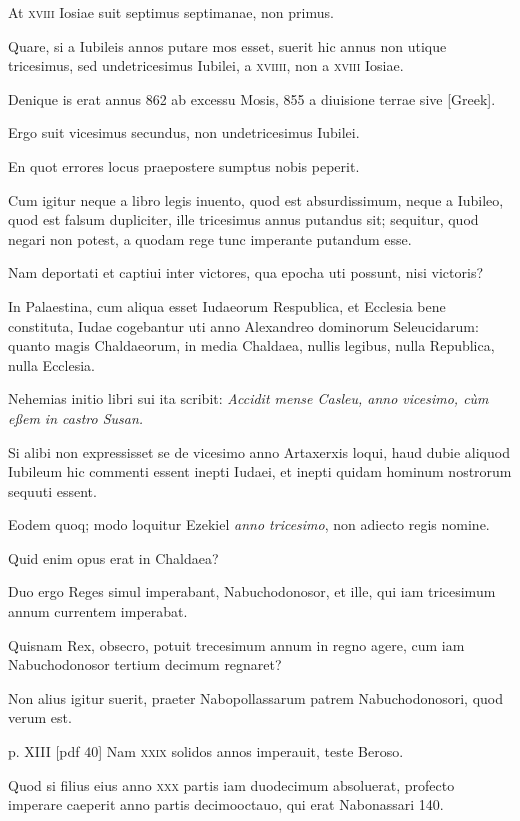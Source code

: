 \begin{parnumbers}
At \textsc{xviii} Iosiae suit septimus septimanae, non primus.

Quare, si a Iubileis annos putare mos esset, suerit hic annus non utique
tricesimus, sed undetricesimus Iubilei, a \textsc{xviiii}, non a
\textsc{xviii} Iosiae.

Denique is erat annus 862 ab excessu Mosis, 855 a
diuisione terrae sive \textgreek{[Greek]}.

Ergo suit vicesimus secundus, non
undetricesimus Iubilei.

En quot errores locus praepostere sumptus
nobis peperit.

Cum igitur neque a libro legis inuento, quod est absurdissimum,
neque a Iubileo, quod est falsum dupliciter, ille tricesimus
annus putandus sit; sequitur, quod negari non potest, a
quodam rege tunc imperante putandum esse.

Nam deportati et captiui
inter victores, qua epocha uti possunt, nisi victoris?

In Palaestina,
cum aliqua esset Iudaeorum Respublica, et Ecclesia bene constituta,
Iudae cogebantur uti anno Alexandreo dominorum Seleucidarum:
quanto magis Chaldaeorum, in media Chaldaea, nullis legibus,
nulla Republica, nulla Ecclesia.

Nehemias initio libri sui ita
scribit: \textit{Accidit mense Casleu, anno vicesimo, cùm eßem in castro Susan.}

Si alibi non expressisset se de vicesimo anno Artaxerxis loqui, haud
dubie aliquod Iubileum hic commenti essent inepti Iudaei, et inepti
quidam hominum nostrorum sequuti essent.

Eodem quoq; modo
loquitur Ezekiel \textit{anno tricesimo}, non adiecto regis nomine.

Quid enim opus erat in Chaldaea?

Duo ergo Reges simul imperabant,
Nabuchodonosor, et ille, qui iam tricesimum annum currentem
imperabat.

Quisnam Rex, obsecro, potuit trecesimum annum in regno
agere, cum iam Nabuchodonosor tertium decimum regnaret?

Non alius igitur suerit, praeter Nabopollassarum patrem Nabuchodonosori,
quod verum est.

\clearpage
p. XIII [pdf 40]
Nam \textsc{xxix} solidos annos imperauit,
teste Beroso.

Quod si filius eius anno \textsc{xxx} partis iam duodecimum
absoluerat, profecto imperare caeperit anno partis decimooctauo,
qui erat Nabonassari 140.


\end{parnumbers}
